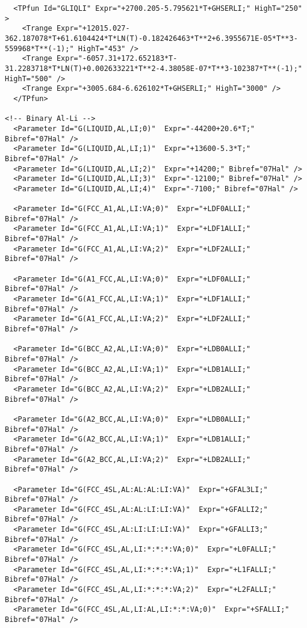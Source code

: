 \documentclass{article}
\begin{document}
\begin{appendices}
\begin{verbatim}
  <TPfun Id="GLIQLI" Expr="+2700.205-5.795621*T+GHSERLI;" HighT="250" >
    <Trange Expr="+12015.027-362.187078*T+61.6104424*T*LN(T)-0.182426463*T**2+6.3955671E-05*T**3-559968*T**(-1);" HighT="453" /> 
    <Trange Expr="-6057.31+172.652183*T-31.2283718*T*LN(T)+0.002633221*T**2-4.38058E-07*T**3-102387*T**(-1);" HighT="500" /> 
    <Trange Expr="+3005.684-6.626102*T+GHSERLI;" HighT="3000" /> 
  </TPfun>

<!-- Binary Al-Li -->
  <Parameter Id="G(LIQUID,AL,LI;0)"  Expr="-44200+20.6*T;" Bibref="07Hal" />
  <Parameter Id="G(LIQUID,AL,LI;1)"  Expr="+13600-5.3*T;" Bibref="07Hal" />
  <Parameter Id="G(LIQUID,AL,LI;2)"  Expr="+14200;" Bibref="07Hal" />
  <Parameter Id="G(LIQUID,AL,LI;3)"  Expr="-12100;" Bibref="07Hal" />
  <Parameter Id="G(LIQUID,AL,LI;4)"  Expr="-7100;" Bibref="07Hal" />

  <Parameter Id="G(FCC_A1,AL,LI:VA;0)"  Expr="+LDF0ALLI;" Bibref="07Hal" />
  <Parameter Id="G(FCC_A1,AL,LI:VA;1)"  Expr="+LDF1ALLI;" Bibref="07Hal" />
  <Parameter Id="G(FCC_A1,AL,LI:VA;2)"  Expr="+LDF2ALLI;" Bibref="07Hal" />

  <Parameter Id="G(A1_FCC,AL,LI:VA;0)"  Expr="+LDF0ALLI;" Bibref="07Hal" />
  <Parameter Id="G(A1_FCC,AL,LI:VA;1)"  Expr="+LDF1ALLI;" Bibref="07Hal" />
  <Parameter Id="G(A1_FCC,AL,LI:VA;2)"  Expr="+LDF2ALLI;" Bibref="07Hal" />

  <Parameter Id="G(BCC_A2,AL,LI:VA;0)"  Expr="+LDB0ALLI;" Bibref="07Hal" />
  <Parameter Id="G(BCC_A2,AL,LI:VA;1)"  Expr="+LDB1ALLI;" Bibref="07Hal" />
  <Parameter Id="G(BCC_A2,AL,LI:VA;2)"  Expr="+LDB2ALLI;" Bibref="07Hal" />

  <Parameter Id="G(A2_BCC,AL,LI:VA;0)"  Expr="+LDB0ALLI;" Bibref="07Hal" />
  <Parameter Id="G(A2_BCC,AL,LI:VA;1)"  Expr="+LDB1ALLI;" Bibref="07Hal" />
  <Parameter Id="G(A2_BCC,AL,LI:VA;2)"  Expr="+LDB2ALLI;" Bibref="07Hal" />

  <Parameter Id="G(FCC_4SL,AL:AL:AL:LI:VA)"  Expr="+GFAL3LI;" Bibref="07Hal" />
  <Parameter Id="G(FCC_4SL,AL:AL:LI:LI:VA)"  Expr="+GFALLI2;" Bibref="07Hal" />
  <Parameter Id="G(FCC_4SL,AL:LI:LI:LI:VA)"  Expr="+GFALLI3;" Bibref="07Hal" />
  <Parameter Id="G(FCC_4SL,AL,LI:*:*:*:VA;0)"  Expr="+L0FALLI;" Bibref="07Hal" />
  <Parameter Id="G(FCC_4SL,AL,LI:*:*:*:VA;1)"  Expr="+L1FALLI;" Bibref="07Hal" />
  <Parameter Id="G(FCC_4SL,AL,LI:*:*:*:VA;2)"  Expr="+L2FALLI;" Bibref="07Hal" />
  <Parameter Id="G(FCC_4SL,AL,LI:AL,LI:*:*:VA;0)"  Expr="+SFALLI;" Bibref="07Hal" />


\end{verbatim}
\end{appendices}
\end{document}

